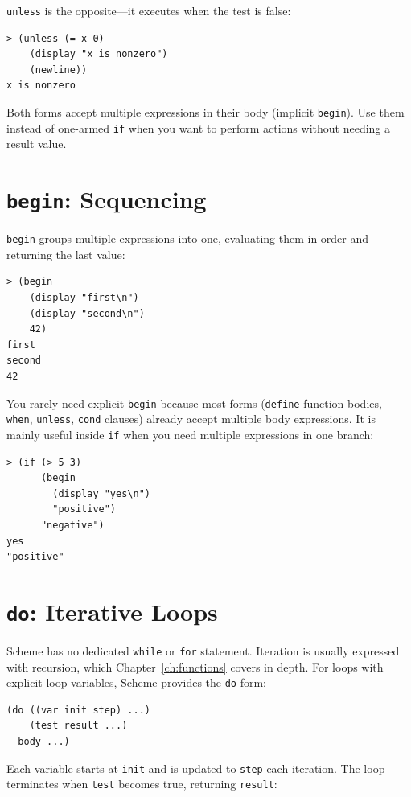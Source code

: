 \texttt{unless} is the opposite---it executes when the test is false:

\begin{lstlisting}[style=repl]
> (unless (= x 0)
    (display "x is nonzero")
    (newline))
x is nonzero
\end{lstlisting}

Both forms accept multiple expressions in their body (implicit \texttt{begin}). Use them instead of one-armed \texttt{if} when you want to perform actions without needing a result value.

\section{\texttt{begin}: Sequencing}

\texttt{begin} groups multiple expressions into one, evaluating them in order and returning the last value:

\begin{lstlisting}[style=repl]
> (begin
    (display "first\n")
    (display "second\n")
    42)
first
second
42
\end{lstlisting}

You rarely need explicit \texttt{begin} because most forms (\texttt{define} function bodies, \texttt{when}, \texttt{unless}, \texttt{cond} clauses) already accept multiple body expressions. It is mainly useful inside \texttt{if} when you need multiple expressions in one branch:

\begin{lstlisting}[style=repl]
> (if (> 5 3)
      (begin
        (display "yes\n")
        "positive")
      "negative")
yes
"positive"
\end{lstlisting}

\section{\texttt{do}: Iterative Loops}

Scheme has no dedicated \texttt{while} or \texttt{for} statement. Iteration is usually expressed with recursion, which Chapter~\ref{ch:functions} covers in depth. For loops with explicit loop variables, Scheme provides the \texttt{do} form:

\begin{lstlisting}
(do ((var init step) ...)
    (test result ...)
  body ...)
\end{lstlisting}

Each variable starts at \texttt{init} and is updated to \texttt{step} each iteration. The loop terminates when \texttt{test} becomes true, returning \texttt{result}:

